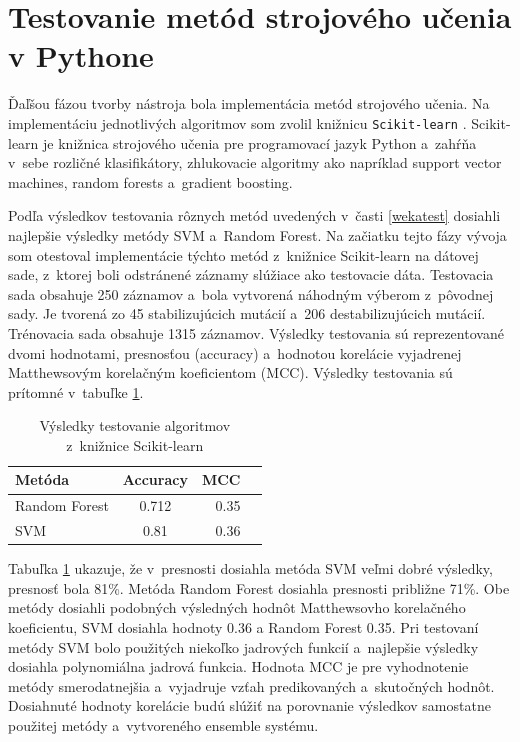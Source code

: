 \section{Testovanie metód strojového učenia v Pythone}

Ďaľšou fázou tvorby nástroja bola implementácia metód strojového učenia. Na implementáciu jednotlivých algoritmov som zvolil knižnicu {\tt Scikit-learn} \cite{scikit-learn}. Scikit-learn je knižnica strojového učenia pre programovací jazyk Python a~zahŕňa v~sebe rozličné klasifikátory, zhlukovacie algoritmy ako napríklad support vector machines, random forests a~gradient boosting.

Podľa výsledkov testovania rôznych metód uvedených v~časti \ref{wekatest} dosiahli najlepšie výsledky metódy SVM a~Random Forest. Na začiatku tejto fázy vývoja som otestoval implementácie týchto metód z~knižnice Scikit-learn na dátovej sade, z~ktorej boli odstránené záznamy slúžiace ako testovacie dáta. Testovacia sada obsahuje 250 záznamov a~bola vytvorená náhodným výberom z~pôvodnej sady. Je tvorená zo 45 stabilizujúcich mutácií a~206 destabilizujúcich mutácií. Trénovacia sada obsahuje 1315 záznamov. Výsledky testovania sú reprezentované dvomi hodnotami, presnosťou (accuracy) a~hodnotou korelácie vyjadrenej Matthewsovým korelačným koeficientom (MCC). Výsledky testovania sú prítomné v~tabuľke \ref{scikittest}.
\begin{table}[H]
	\centering
	\begin{tabular}{ | l | c | r | l| }
		\hline 
		Metóda  & Accuracy & MCC \\ \hline
		Random Forest & 0.712 & 0.35\\ \hline
		SVM & 0.81 & 0.36 \\\hline
	\end{tabular}
	\caption {Výsledky testovanie algoritmov z~knižnice Scikit-learn} \label{scikittest} 
\end{table}

Tabuľka \ref{scikittest} ukazuje, že v~presnosti dosiahla metóda SVM veľmi dobré výsledky, presnosť bola 81\%. Metóda Random Forest dosiahla presnosti približne 71\%. Obe metódy dosiahli podobných výsledných hodnôt Matthewsovho korelačného koeficientu, SVM dosiahla hodnoty 0.36 a Random Forest 0.35. Pri testovaní metódy SVM bolo použitých niekoľko jadrových funkcií a~najlepšie výsledky dosiahla polynomiálna jadrová funkcia. Hodnota MCC je pre vyhodnotenie metódy smerodatnejšia a~vyjadruje vzťah predikovaných a~skutočných hodnôt. Dosiahnuté hodnoty korelácie budú slúžiť na porovnanie výsledkov samostatne použitej metódy a~vytvoreného ensemble systému.

